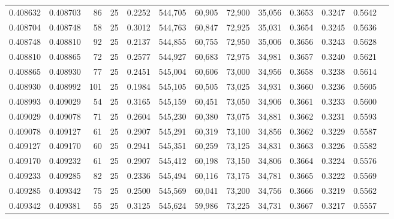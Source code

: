 \begin{tabular}{rrrrrrrrrrrrr}
0.408632 & 0.408703 &    86 &  25 &                                     0.2252 & 544,705 &  60,905 &  72,900 &  35,056 & 0.3653 & 0.3247 & 0.5642 \\
0.408704 & 0.408748 &    58 &  25 &                                     0.3012 & 544,763 &  60,847 &  72,925 &  35,031 & 0.3654 & 0.3245 & 0.5636 \\
0.408748 & 0.408810 &    92 &  25 &                                     0.2137 & 544,855 &  60,755 &  72,950 &  35,006 & 0.3656 & 0.3243 & 0.5628 \\
0.408810 & 0.408865 &    72 &  25 &                                     0.2577 & 544,927 &  60,683 &  72,975 &  34,981 & 0.3657 & 0.3240 & 0.5621 \\
0.408865 & 0.408930 &    77 &  25 &                                     0.2451 & 545,004 &  60,606 &  73,000 &  34,956 & 0.3658 & 0.3238 & 0.5614 \\
0.408930 & 0.408992 &   101 &  25 &                                     0.1984 & 545,105 &  60,505 &  73,025 &  34,931 & 0.3660 & 0.3236 & 0.5605 \\
0.408993 & 0.409029 &    54 &  25 &                                     0.3165 & 545,159 &  60,451 &  73,050 &  34,906 & 0.3661 & 0.3233 & 0.5600 \\
0.409029 & 0.409078 &    71 &  25 &                                     0.2604 & 545,230 &  60,380 &  73,075 &  34,881 & 0.3662 & 0.3231 & 0.5593 \\
0.409078 & 0.409127 &    61 &  25 &                                     0.2907 & 545,291 &  60,319 &  73,100 &  34,856 & 0.3662 & 0.3229 & 0.5587 \\
0.409127 & 0.409170 &    60 &  25 &                                     0.2941 & 545,351 &  60,259 &  73,125 &  34,831 & 0.3663 & 0.3226 & 0.5582 \\
0.409170 & 0.409232 &    61 &  25 &                                     0.2907 & 545,412 &  60,198 &  73,150 &  34,806 & 0.3664 & 0.3224 & 0.5576 \\
0.409233 & 0.409285 &    82 &  25 &                                     0.2336 & 545,494 &  60,116 &  73,175 &  34,781 & 0.3665 & 0.3222 & 0.5569 \\
0.409285 & 0.409342 &    75 &  25 &                                     0.2500 & 545,569 &  60,041 &  73,200 &  34,756 & 0.3666 & 0.3219 & 0.5562 \\
0.409342 & 0.409381 &    55 &  25 &                                     0.3125 & 545,624 &  59,986 &  73,225 &  34,731 & 0.3667 & 0.3217 & 0.5557 \\

\end{tabular}
